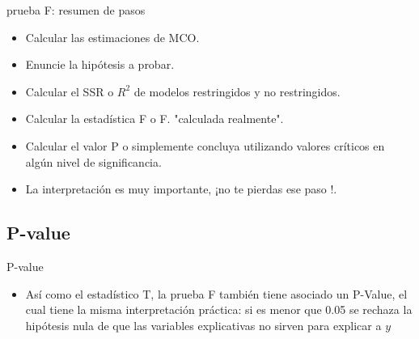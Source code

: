 \begin{frame}{prueba F: resumen de pasos}
	\begin{itemize}
		\item Calcular las estimaciones de MCO.
		\item Enuncie la hipótesis a probar.
		\item Calcular el SSR o $R^2$ de modelos restringidos y no restringidos.
		\item Calcular la estadística F o F. "calculada realmente".
		\item Calcular el valor P o simplemente concluya utilizando valores críticos en algún nivel de significancia.
		\item La interpretación es muy importante, ¡no te pierdas ese paso !.
	\end{itemize}
\end{frame}

\subsection{P-value}
\begin{frame}{P-value}
	\begin{itemize}
		\item Así como el estadístico T, la prueba F también tiene asociado un P-Value, el cual tiene la misma interpretación práctica: si es menor que 0.05 se rechaza la hipótesis nula de que las variables explicativas no sirven para explicar a $y$
	\end{itemize}
\end{frame}

